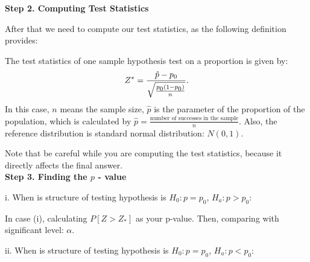 \textbf{Step 2. Computing Test Statistics}

After that we need to compute our test statistics, as the following definition provides:

\begin{definition}
The test statistics of one sample hypothesis test on a proportion is given by: \[ Z^* = \frac{\hat{p} - p_{\text{\scriptsize$0$}}}{\sqrt{\frac{p_{\text{\scriptsize$0$}}(1-p_{\text{\scriptsize$0$}})}{n}}}.\]
In this case, $n$ means the sample size, $\hat{p}$ is the parameter of the proportion of the population, which is calculated by $\hat{p} = \frac{\text{number of successes in the sample}}{n}$. Also, the reference distribution is standard normal distribution: $N(0,1)$.
\end{definition}

Note that be careful while you are computing the test statistics, because it directly affects the final answer.\\

\textbf{Step 3. Finding the $p$ - value}

i. When is structure of testing hypothesis is $H_0: p = p_0$, $H_a: p > p_0$:

\begin{center}
\end{center}
In case (i), calculating $P[Z > Z_*]$ as your p-value. Then, comparing with significant level: $\alpha$.

ii. When is structure of testing hypothesis is $H_0: p = p_0$, $H_a: p < p_0$:


